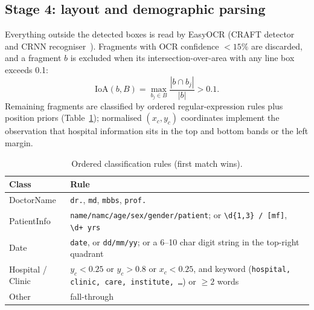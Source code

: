 \documentclass[journal]{IEEEtran}
\begin{document}
\subsection{Stage 4: layout and demographic parsing}\label{sec:parse}
Everything outside the detected boxes is read by EasyOCR (CRAFT detector~\cite{baek2019craft} and CRNN recogniser~\cite{shi2017crnn,jaidedai2020easyocr}). Fragments with OCR confidence $<15\%$ are discarded, and a fragment $b$ is excluded when its intersection-over-area with any line box exceeds 0.1:
\begin{equation}
\mathrm{IoA}(b,B)=\max_{b_j\in B}\frac{|b\cap b_j|}{|b|}>0.1 .
\end{equation}
Remaining fragments are classified by ordered regular-expression rules plus position priors (Table~\ref{tab:rules}); normalised $(x_c,y_c)$ coordinates implement the observation that hospital information sits in the top and bottom bands or the left margin.

\begin{table}[t]
\centering
\caption{Ordered classification rules (first match wins).}
\label{tab:rules}
\small
\begin{tabular}{p{1.6cm}p{6.3cm}}
\toprule
\textbf{Class} & \textbf{Rule} \\
\midrule
DoctorName & \texttt{dr.}, \texttt{md}, \texttt{mbbs}, \texttt{prof.} \\
PatientInfo & \texttt{name/namc/age/sex/gender/patient}; or \texttt{\textbackslash d\{1,3\}\,/\,[mf]}, \texttt{\textbackslash d+\,yrs} \\
Date & \texttt{date}, or \texttt{dd/mm/yy}; or a 6--10 char digit string in the top-right quadrant \\
Hospital / Clinic & $y_c<0.25$ or $y_c>0.8$ or $x_c<0.25$, and keyword (\texttt{hospital, clinic, care, institute, \ldots}) or $\ge2$ words \\
Other & fall-through \\
\bottomrule
\end{tabular}
\end{table}
\end{document}
